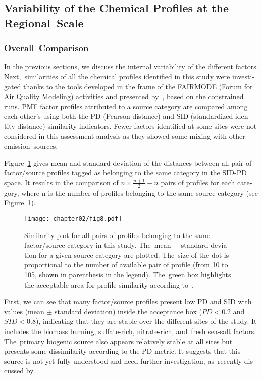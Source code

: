 \begin{otherlanguage}{english}
\subsection{Variability of the Chemical Profiles at the Regional~Scale}%
\label{sub:variability_of_the_chemical_profiles_at_the_regional_scale}

\subsubsection{Overall~Comparison}%
\label{ssub:overall_comparison}

In the previous sections, we discuss  the internal variability of the different factors.
Next,~similarities of all the chemical profiles identified in this study were investigated
thanks to the tools developed in the frame of the FAIRMODE (Forum for Air Quality
Modeling) activities and presented by~\textcite{belisNew2015}, based on the constrained
runs. PMF factor profiles attributed to a source category are compared among each other's
using both the PD (Pearson distance) and SID (standardized identity distance) similarity
indicators. Fewer factors identified at some sites were not considered in this assessment
analysis as they showed some mixing with other emission~sources.

Figure~\ref{fig:fig8} gives mean and standard deviation of the distances between all pair
of factor/source profiles tagged as belonging to the same category in the SID-PD space. It
results in the comparison of $n\times\frac{n+1}{2}-n$ pairs of profiles for each category,
where n is the number of profiles belonging to the same source category (see
Figure~\ref{fig:fig8}).

\begin{figure}[ht]
    \centering
    \texttt{[image: chapter02/fig8.pdf]}
    \caption{
       Similarity plot for all pairs of profiles belonging to the same
        factor/source category in this study. The~mean $\pm$ standard deviation
        for a given source category are plotted. The~size of the dot is
        proportional to the number of available pair of profile (from 10 to 105,
        shown in parenthesis in the legend). The~green box highlights the
        acceptable area for profile similarity according
        to~\textcite{pernigottiDeltaSA2018}.
    }
    \label{fig:fig8}
\end{figure}

First, we can see that many factor/source profiles present low PD and SID with values
(mean $\pm$ standard deviation) inside the acceptance box ($PD<0.2$ and $SID<0.8$),
indicating that they are stable over the different sites of the study.  It includes the
biomass burning, sulfate-rich, nitrate-rich, and~fresh sea-salt factors. The~primary
biogenic source also appears relatively stable at all sites but presents some
dissimilarity according to the PD metric. It suggests that this source is not yet fully
understood and need further investigation, as~recently discussed
by~\textcite{samakePolyols2019}.


\end{otherlanguage}
